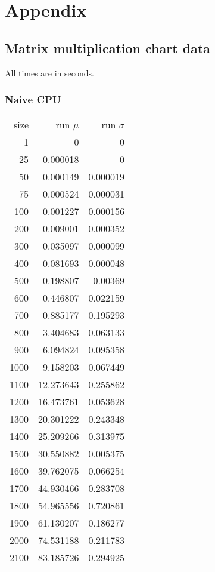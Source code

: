 \section{Appendix}

\subsection{Matrix multiplication chart data}
\label{sec:matrix_mul_chart_data}

All times are in seconds.

\subsubsection{Naive CPU}

\begin{longtable}{r r r}
size & run $\mu$ & run $\sigma$ \\
1 & 0 & 0 \\
25 & 0.000018 & 0 \\
50 & 0.000149 & 0.000019 \\
75 & 0.000524 & 0.000031 \\
100 & 0.001227 & 0.000156 \\
200 & 0.009001 & 0.000352 \\
300 & 0.035097 & 0.000099 \\
400 & 0.081693 & 0.000048 \\
500 & 0.198807 & 0.00369 \\
600 & 0.446807 & 0.022159 \\
700 & 0.885177 & 0.195293 \\
800 & 3.404683 & 0.063133 \\
900 & 6.094824 & 0.095358 \\
1000 & 9.158203 & 0.067449 \\
1100 & 12.273643 & 0.255862 \\
1200 & 16.473761 & 0.053628 \\
1300 & 20.301222 & 0.243348 \\
1400 & 25.209266 & 0.313975 \\
1500 & 30.550882 & 0.005375 \\
1600 & 39.762075 & 0.066254 \\
1700 & 44.930466 & 0.283708 \\
1800 & 54.965556 & 0.720861 \\
1900 & 61.130207 & 0.186277 \\
2000 & 74.531188 & 0.211783 \\
2100 & 83.185726 & 0.294925 \\

\end{longtable}
